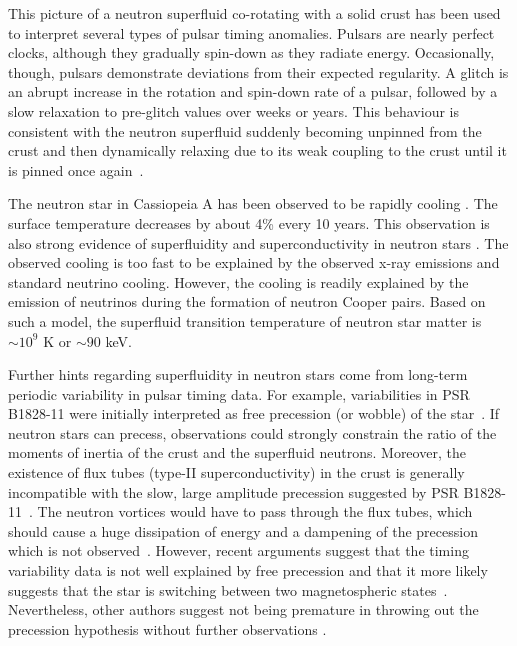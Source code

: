 This picture of a neutron superfluid co-rotating with a solid crust 
has been used to interpret several types of pulsar timing anomalies.
Pulsars are nearly perfect clocks, although they gradually spin-down 
as they radiate energy. Occasionally, though, pulsars demonstrate 
deviations from their expected regularity. A glitch is an abrupt 
increase in the rotation and spin-down rate of a pulsar, followed 
by a slow relaxation to pre-glitch values over weeks or years. This 
behaviour is consistent with the neutron superfluid suddenly 
becoming unpinned from the crust and then dynamically relaxing 
due to its weak coupling to the crust until it is pinned once 
again~\cite{1975Natur.256...25A}.

The neutron star in Cassiopeia A has been observed to be rapidly cooling
\cite{2010ApJ...719L.167H}. The surface temperature decreases by about 
4\% every 10 years. This observation is also strong evidence 
of superfluidity and superconductivity in neutron stars
\cite{2011PhRvL.106h1101P, 2011MNRAS.412L.108S}. The observed cooling 
is too fast to be explained by the observed x-ray emissions 
and standard neutrino cooling. However, 
the cooling is readily explained by the emission of neutrinos during 
the formation of neutron Cooper pairs. Based on such a model, 
the superfluid transition temperature of neutron star matter is
$\sim 10^{9}$ K or $\sim 90$ keV. 

Further hints regarding superfluidity in neutron stars 
come from long-term periodic variability
in pulsar timing data. For example, variabilities in PSR B1828-11
were initially interpreted as free 
precession (or wobble) of the star~\cite{2000Natur.406..484S}. 
If neutron stars can
precess, observations could strongly constrain the ratio of the moments
of inertia of the crust and the superfluid neutrons. Moreover, the existence
of flux tubes (\ie type-II superconductivity)
in the crust is generally incompatible with the slow, large 
amplitude precession suggested by PSR B1828-11~\cite{2000Natur.406..484S}. The neutron vortices 
would have to pass through the flux tubes, which should cause a huge dissipation 
of energy and a dampening of the precession which is not observed~\cite{PhysRevLett.91.101101}. 
However,
recent arguments suggest that the timing variability data is not well explained 
by free precession and that it more likely suggests that the star is switching between 
two magnetospheric states~\cite{2010Sci...329..408L}. 
Nevertheless, other authors suggest not being premature in throwing 
out the precession hypothesis without further observations
\cite{2012MNRAS.420.2325J}.

